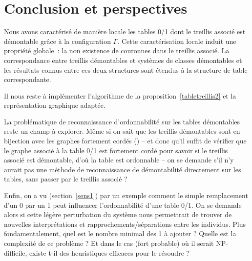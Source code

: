 \documentclass[a4paper]{report}
\begin{document}
\chapter{Conclusion et perspectives}

\label{sccl}

Nous avons caractérisé de manière locale les tables 0/1 dont le treillis associé est démontable grâce à la configuration $\Gamma$.
Cette caractérisation locale induit une propriété globale~: la non existence de couronnes dans le treillis associé.
La correspondance entre treillis démontables et systèmes de classes démontables et les résultats connus entre ces deux structures sont 
étendus à la structure de table correspondante.

Il nous reste à implémenter l'algorithme de la proposition~\ref{tabletreillis2} et la représenta\-tion graphique adaptée.

La problématique de reconnaissance d'ordonnabilité sur les tables démonta\-bles reste un champ à explorer. Même si on sait que les treillis démonta\-bles sont en bijection avec les graphes 
fortement cordés (\cite{crow_free}) -- et donc qu'il suffit de vérifier que le graphe associé à la table 0/1 est fortement cordé pour savoir si le treillis associé 
est démontable, d'où la table est ordonnable -- on se demande s'il n'y aurait pas une méthode de reconnaissance de démontabilité directement sur les tables, 
sans passer par le treillis associé ?

Enfin, on a vu (section~\ref{sens1}) par un exemple comment le simple remplacement d'un 0 par un 1 peut influencer l'ordonnabilité d'une table 0/1. On se demande alors 
si cette légère perturbation du système nous permettrait de trouver de nouvelles interprétations et rapprochements/séparations entre les individus. Plus fondamentalement, quel est le
 nombre minimal des 1 à ajouter ? Quelle est la complexité de ce problème ? Et dans le cas (fort probable) où il serait NP-difficile, existe t-il des heuristiques efficaces pour le résoudre ?  
\end{document}
